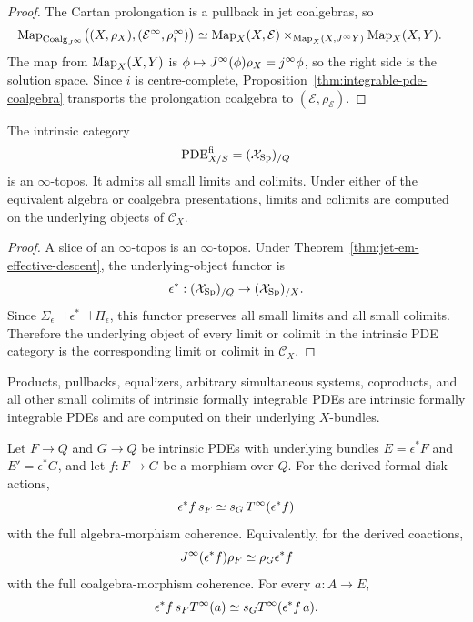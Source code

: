 \begin{proof}
The Cartan prolongation is a pullback in jet coalgebras, so
\[
\begin{aligned}
\operatorname{Map}_{\operatorname{Coalg}_{J^{\infty}}}
\bigl((X,\rho_X),(\mathcal E^\infty,\rho_i^\infty)\bigr)
&\simeq
\operatorname{Map}_X(X,\mathcal E)
\times_{\operatorname{Map}_X(X,J^{\infty} Y)}
\operatorname{Map}_X(X,Y).
\end{aligned}
\]
The map from $\operatorname{Map}_X(X,Y)$ is $\phi\mapsto J^{\infty}(\phi)\rho_X=j^\infty\phi$, so the right side is the solution space.  Since $i$ is centre-complete, Proposition~\ref{thm:integrable-pde-coalgebra} transports the prolongation coalgebra to $(\mathcal E,\rho_{\mathcal E})$.
\end{proof}

\begin{theorem}
\label{thm:pde-topos}
\label{thm:pde-finite-limits}
The intrinsic category
\[
    \operatorname{PDE}^{\mathrm{fi}}_{X/S}=(\mathcal{X}_{\mathrm{Sp}})_{/Q}
\]
is an $\infty$-topos.  It admits all small limits and colimits.  Under either of the equivalent algebra or coalgebra presentations, limits and colimits are computed on the underlying objects of $\mathcal C_X$.
\end{theorem}

\begin{proof}
A slice of an $\infty$-topos is an $\infty$-topos.  Under Theorem~\ref{thm:jet-em-effective-descent}, the underlying-object functor is
\[
    \epsilon^*:(\mathcal{X}_{\mathrm{Sp}})_{/Q}\to(\mathcal{X}_{\mathrm{Sp}})_{/X}.
\]
Since $\Sigma_\epsilon\dashv\epsilon^*\dashv\Pi_\epsilon$, this functor preserves all small limits and all small colimits.  Therefore the underlying object of every limit or colimit in the intrinsic PDE category is the corresponding limit or colimit in $\mathcal C_X$.
\end{proof}

\begin{corollary}
Products, pullbacks, equalizers, arbitrary simultaneous systems, coproducts, and all other small colimits of intrinsic formally integrable PDEs are intrinsic formally integrable PDEs and are computed on their underlying $X$-bundles.
\end{corollary}

\begin{proposition}
\label{prop:universal-family-detects}
Let $F\to Q$ and $G\to Q$ be intrinsic PDEs with underlying bundles $E=\epsilon^*F$ and $E'=\epsilon^*G$, and let $f:F\to G$ be a morphism over $Q$.  For the derived formal-disk actions,
\[
    \epsilon^*f\,s_F
    \simeq
    s_G\,T^{\infty}(\epsilon^*f)
\]
with the full algebra-morphism coherence.  Equivalently, for the derived coactions,
\[
    J^{\infty}(\epsilon^*f)\rho_F
    \simeq
    \rho_G\epsilon^*f
\]
with the full coalgebra-morphism coherence.  For every $a:A\to E$,
\[
    \epsilon^*f\,s_FT^{\infty}(a)
    \simeq
    s_GT^{\infty}(\epsilon^*f\,a).
\]
\end{proposition}

